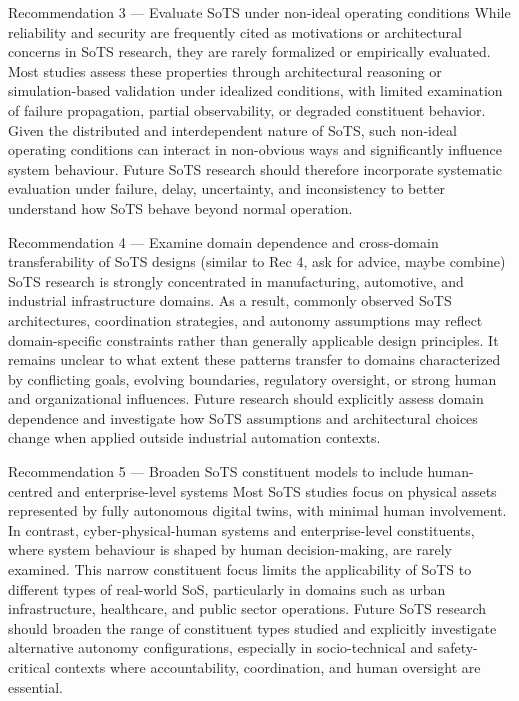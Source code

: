 Recommendation 3 — Evaluate SoTS under non-ideal operating conditions
While reliability and security are frequently cited as motivations or architectural concerns in SoTS research, they are rarely formalized or empirically evaluated. Most studies assess these properties through architectural reasoning or simulation-based validation under idealized conditions, with limited examination of failure propagation, partial observability, or degraded constituent behavior. Given the distributed and interdependent nature of SoTS, such non-ideal operating conditions can interact in non-obvious ways and significantly influence system behaviour. Future SoTS research should therefore incorporate systematic evaluation under failure, delay, uncertainty, and inconsistency to better understand how SoTS behave beyond normal operation.


Recommendation 4 — Examine domain dependence and cross-domain transferability of SoTS designs (similar to Rec 4, ask for advice, maybe combine)
SoTS research is strongly concentrated in manufacturing, automotive, and industrial infrastructure domains. As a result, commonly observed SoTS architectures, coordination strategies, and autonomy assumptions may reflect domain-specific constraints rather than generally applicable design principles. It remains unclear to what extent these patterns transfer to domains characterized by conflicting goals, evolving boundaries, regulatory oversight, or strong human and organizational influences. Future research should explicitly assess domain dependence and investigate how SoTS assumptions and architectural choices change when applied outside industrial automation contexts.


Recommendation 5 — Broaden SoTS constituent models to include human-centred and enterprise-level systems
Most SoTS studies focus on physical assets represented by fully autonomous digital twins, with minimal human involvement. In contrast, cyber-physical-human systems and enterprise-level constituents, where system behaviour is shaped by human decision-making, are rarely examined. This narrow constituent focus limits the applicability of SoTS to different types of real-world SoS, particularly in domains such as urban infrastructure, healthcare, and public sector operations. Future SoTS research should broaden the range of constituent types studied and explicitly investigate alternative autonomy configurations, especially in socio-technical and safety-critical contexts where accountability, coordination, and human oversight are essential.


